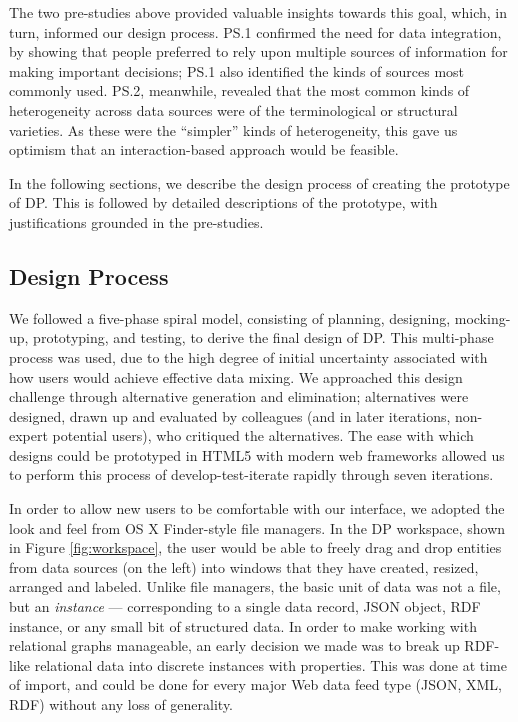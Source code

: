 \documentclass{sigchi}
\begin{document}

The two pre-studies above provided valuable insights towards this goal, which, in turn, informed our design process. PS.1 confirmed the need for data integration, by showing that people preferred to rely upon multiple sources of information for making important decisions; PS.1 also identified the kinds of sources most commonly used.  PS.2, meanwhile, revealed that the most common kinds of heterogeneity across data sources were of the terminological or structural varieties. As these were the ``simpler'' kinds of heterogeneity, this gave us optimism that an interaction-based approach would be feasible.  

In the following sections, we describe the design process of creating the prototype of DP.  This is followed by detailed descriptions of the prototype, with justifications grounded in the pre-studies.

\subsection{Design Process}
We followed a five-phase spiral model, consisting of planning, designing, mocking-up, prototyping, and testing, to derive the final design of DP.  This multi-phase process was used, due to the high degree of initial uncertainty associated with how users would achieve effective data mixing. We approached this design challenge through alternative generation and elimination; alternatives were designed, drawn up and evaluated by colleagues (and in later iterations, non-expert potential users), who critiqued the alternatives. The ease with which designs could be prototyped in HTML5 with modern web frameworks allowed us to perform this process of develop-test-iterate rapidly through seven iterations.

In order to allow new users to be comfortable with our interface, we adopted the look and feel from OS X Finder-style file managers.  In the DP workspace, shown in Figure \ref{fig:workspace}, the user would be able to freely drag and drop entities from data sources (on the left) into windows that they have created, resized, arranged and labeled. Unlike file managers, the basic unit of data was not a file, but an \emph{instance} --- corresponding to a single data record, JSON object, RDF instance, or any small bit of structured data. In order to make working with relational graphs manageable, an early decision we made was to break up RDF-like relational data into discrete instances with properties. This was done at time of import, and could be done for every major Web data feed type (JSON, XML, RDF) without any loss of generality.
\end{document}
